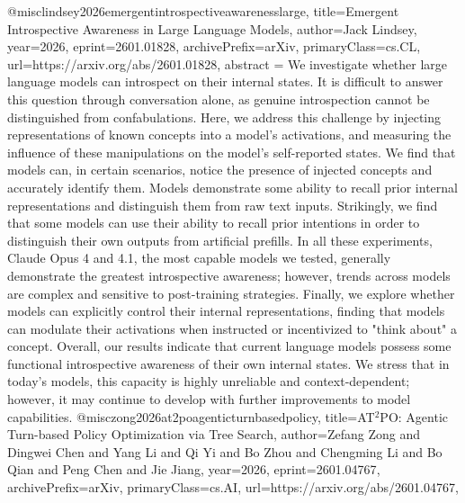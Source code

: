 {}@misc{lindsey2026emergentintrospectiveawarenesslarge,
      title={Emergent Introspective Awareness in Large Language Models}, 
      author={Jack Lindsey},
      year={2026},
      eprint={2601.01828},
      archivePrefix={arXiv},
      primaryClass={cs.CL},
      url={https://arxiv.org/abs/2601.01828},
      abstract = {We investigate whether large language models can introspect on their internal states. It is difficult to answer this question through conversation alone, as genuine introspection cannot be distinguished from confabulations. Here, we address this challenge by injecting representations of known concepts into a model's activations, and measuring the influence of these manipulations on the model's self-reported states. We find that models can, in certain scenarios, notice the presence of injected concepts and accurately identify them. Models demonstrate some ability to recall prior internal representations and distinguish them from raw text inputs. Strikingly, we find that some models can use their ability to recall prior intentions in order to distinguish their own outputs from artificial prefills. In all these experiments, Claude Opus 4 and 4.1, the most capable models we tested, generally demonstrate the greatest introspective awareness; however, trends across models are complex and sensitive to post-training strategies. Finally, we explore whether models can explicitly control their internal representations, finding that models can modulate their activations when instructed or incentivized to "think about" a concept. Overall, our results indicate that current language models possess some functional introspective awareness of their own internal states. We stress that in today's models, this capacity is highly unreliable and context-dependent; however, it may continue to develop with further improvements to model capabilities.}
}@misc{zong2026at2poagenticturnbasedpolicy,
      title={AT$^2$PO: Agentic Turn-based Policy Optimization via Tree Search}, 
      author={Zefang Zong and Dingwei Chen and Yang Li and Qi Yi and Bo Zhou and Chengming Li and Bo Qian and Peng Chen and Jie Jiang},
      year={2026},
      eprint={2601.04767},
      archivePrefix={arXiv},
      primaryClass={cs.AI},
      url={https://arxiv.org/abs/2601.04767},
}
